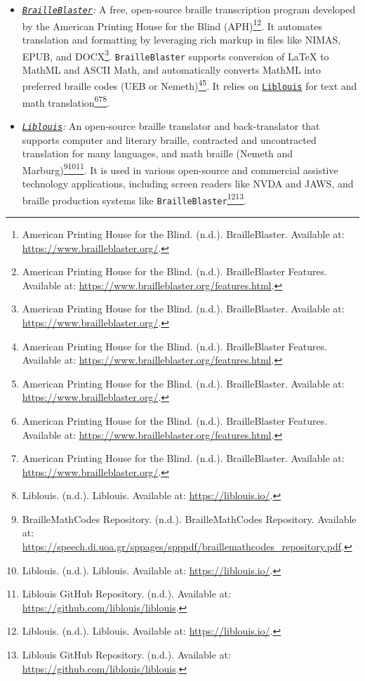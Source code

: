 \begin{itemize}
    \item \emph{\href{https://github.com/aphtech/brailleblaster}{\texttt{BrailleBlaster}}:} A free, open-source braille transcription program developed by the American Printing House for the Blind (APH)\footnote{American Printing House for the Blind. (n.d.). BrailleBlaster. Available at: \url{https://www.brailleblaster.org/}.}\footnote{American Printing House for the Blind. (n.d.). BrailleBlaster Features. Available at: \url{https://www.brailleblaster.org/features.html}.}. It automates translation and formatting by leveraging rich markup in files like NIMAS, EPUB, and DOCX\footnote{American Printing House for the Blind. (n.d.). BrailleBlaster. Available at: \url{https://www.brailleblaster.org/}.}. \texttt{BrailleBlaster} supports conversion of LaTeX to MathML and ASCII Math, and automatically converts MathML into preferred braille codes (UEB or Nemeth)\footnote{American Printing House for the Blind. (n.d.). BrailleBlaster Features. Available at: \url{https://www.brailleblaster.org/features.html}.}\footnote{American Printing House for the Blind. (n.d.). BrailleBlaster. Available at: \url{https://www.brailleblaster.org/}.}. It relies on \href{https://liblouis.io/}{\texttt{Liblouis}} for text and math translation\footnote{American Printing House for the Blind. (n.d.). BrailleBlaster Features. Available at: \url{https://www.brailleblaster.org/features.html}.}\footnote{American Printing House for the Blind. (n.d.). BrailleBlaster. Available at: \url{https://www.brailleblaster.org/}.}\footnote{Liblouis. (n.d.). Liblouis. Available at: \url{https://liblouis.io/}.}.
    \item \emph{\href{https://liblouis.io/}{\texttt{Liblouis}}:} An open-source braille translator and back-translator that supports computer and literary braille, contracted and uncontracted translation for many languages, and math braille (Nemeth and Marburg)\footnote{BrailleMathCodes Repository. (n.d.). BrailleMathCodes Repository. Available at: \url{https://speech.di.uoa.gr/sppages/spppdf/braillemathcodes_repository.pdf}.}\footnote{Liblouis. (n.d.). Liblouis. Available at: \url{https://liblouis.io/}.}\footnote{Liblouis GitHub Repository. (n.d.). Available at: \url{https://github.com/liblouis/liblouis}.}. It is used in various open-source and commercial assistive technology applications, including screen readers like NVDA and JAWS, and braille production systems like \texttt{BrailleBlaster}\footnote{Liblouis. (n.d.). Liblouis. Available at: \url{https://liblouis.io/}.}\footnote{Liblouis GitHub Repository. (n.d.). Available at: \url{https://github.com/liblouis/liblouis}.}.
\end{itemize}
